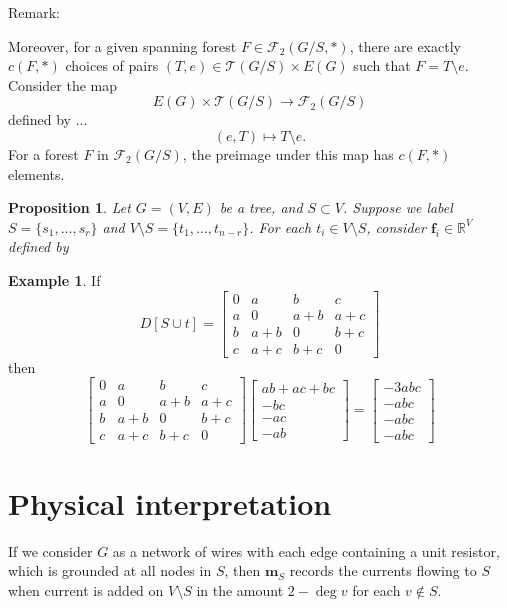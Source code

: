 \documentclass{amsart}
\newtheorem{prop}[thm]{Proposition}
\theoremstyle{definition}
\newtheorem{eg}[thm]{Example}
\newcommand{\RR}{\mathbb{R}}
\newcommand{\trees}{\mathcal{T}}
\newcommand{\forests}{\mathcal{F}}
\begin{document}
Remark:

Moreover, for a given spanning forest
$F \in \forests_2(G/S, *)$,
there are exactly $c(F, *)$ choices of pairs $(T,e) \in \trees(G/S) \times E(G)$ such that
$F = T \setminus e.$
Consider the map
$$
E(G) \times \trees(G/S) \to \forests_2(G/S)
$$
defined by ...
$$
(e, T) \mapsto T \setminus e .
$$
For a forest $F$ in $\forests_2(G/S)$,
the preimage under this map has $c(F,*)$ elements.

\begin{prop}
Let $G = (V,E)$ be a tree, and $S \subset V$.
Suppose we label $S = \{s_1, \ldots, s_r\}$
and $V \setminus S = \{t_1, \ldots, t_{n-r}\}$.
For each $t_i \in V\setminus S$,
consider
$\mathbf{f}_i  \in \RR^V$
defined by
\end{prop}

\begin{eg}
If 
$$
D[S \cup t] = \begin{bmatrix}
0 & a & b & c \\
a & 0 & a + b & a + c \\
b & a + b & 0 & b + c \\
c & a + c & b + c & 0
\end{bmatrix}
$$
then
$$
 \begin{bmatrix}
0 & a & b & c \\
a & 0 & a + b & a + c \\
b & a + b & 0 & b + c \\
c & a + c & b + c & 0
\end{bmatrix}
\begin{bmatrix}
ab + ac + bc \\ -bc \\ -ac \\ -ab 
\end{bmatrix}
= \begin{bmatrix}
-3abc \\ -abc \\ -abc \\ -abc
\end{bmatrix}
$$
\end{eg}

\section{Physical interpretation}

If we consider $G$ as a network of wires with each edge containing a unit resistor,
which is grounded at all nodes in $S$,
then $\mathbf{m}_S$ records the currents flowing to $S$
when current is added on $V\setminus S$ in the amount $2 - \deg v$
for each $v\not\in S$.
\end{document}
